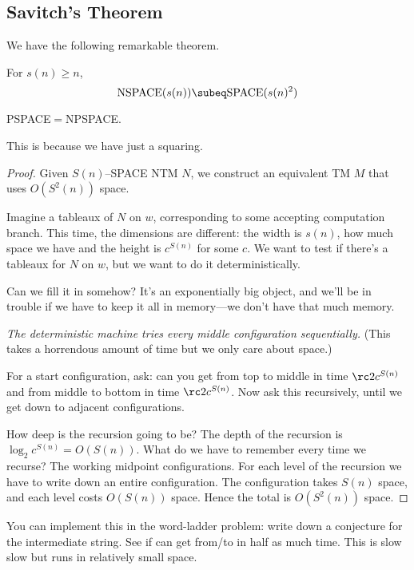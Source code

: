 \subsection{Savitch's Theorem}
We have the following remarkable theorem.
\begin{thm}[Savitch]
For $s(n)\ge n$, 
\[
\text{NSPACE}(s(n))\subeq \text{SPACE}(s(n)^2)
\]
\end{thm}
\begin{cor}
PSPACE$=$NPSPACE.
\end{cor}
This is because we have just a squaring.
\begin{proof}
Given $S(n)$--SPACE NTM $N$, we construct an equivalent TM $M$ that uses $O(S^2(n))$ space.

Imagine a tableaux of $N$ on $w$, corresponding to some accepting computation branch. This time, the dimensions are different: the width is $s(n)$, how much space we have and the height is $c^{S(n)}$ for some $c$. We want to test if there's a tableaux for $N$ on $w$, but we want to do it deterministically. 

Can we fill it in somehow? It's an exponentially big object, and we'll be in trouble if we have to keep it all in memory---we don't have that much memory.

{\it The deterministic machine tries every middle configuration sequentially.} (This takes a horrendous amount of time but we only care about space.)


For a start configuration, ask: can you get from top to middle in time $\rc2c^{S(n)}$ and from middle to bottom in time $\rc 2c^{S(n)}$. Now ask this recursively, until we get down to adjacent configurations. 

How deep is the recursion going to be? The depth of the recursion is $\log_2 c^{S(n)}=O(S(n))$. What do we have to remember every time we recurse? The working midpoint configurations. For each level of the recursion we have to write down an entire configuration. The configuration takes $S(n)$ space, and each level costs $O(S(n))$ space. Hence the total is $O(S^2(n))$ space.
\end{proof}
You can implement this in the word-ladder problem: write down a conjecture for the intermediate string. See if can get from/to in half as much time. This is slow slow but runs in relatively small space. %
